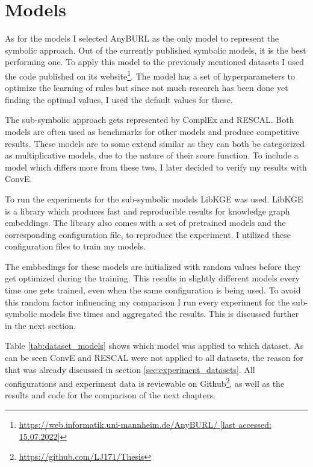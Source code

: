\section{Models}
As for the models I selected AnyBURL as the only model to represent the symbolic approach. Out of the currently published symbolic models, it is the best performing one. To apply this model to the previously mentioned datasets I used the code published on its website\footnote{\href{https://web.informatik.uni-mannheim.de/AnyBURL/}{https://web.informatik.uni-mannheim.de/AnyBURL/ [last accessed: 15.07.2022]}}. The model has a set of hyperparameters to optimize the learning of rules but since not much research has been done yet finding the optimal values, I used the default values for these. \hfill \break

The sub-symbolic approach gets represented by ComplEx and RESCAL. Both models are often used as benchmarks for other models and produce competitive results. These models are to some extend similar as they can both be categorized as multiplicative models, due to the nature of their score function. To include a model which differs more from these two, I later decided to verify my results with ConvE.
 
To run the experiments for the sub-symbolic models LibKGE was used. LibKGE is a library which produces fast and reproducible results for knowledge graph embeddings. \cite{broscheit_libkge_2020} The library also comes with a set of pretrained models and the corresponding configuration file, to reproduce the experiment. I utilized these configuration files to train my models. 

The embbedings for these models are  initialized with random values before they get optimized during the training. This results in slightly different models every time one gets trained, even when the same configuration is being used. To avoid this random factor influencing my comparison I run every experiment for the sub-symbolic models five times and aggregated the results. This is discussed further in the next section. \hfill \break

Table \ref{tab:dataset_models} shows which model was applied to which dataset. As can be seen ConvE and RESCAL were not applied to all datasets, the reason for that was already discussed in section \ref{sec:experiment_datasets}. All configurations and experiment data is reviewable on Github\footnote{\href{https://github.com/LJ171/Thesis}{https://github.com/LJ171/Thesis}}, as well as the results and code for the comparison of the next chapters.


